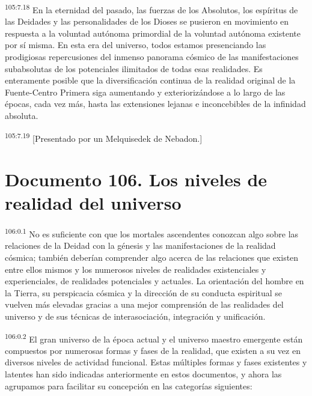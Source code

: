 \documentclass[twoside, 11pt]{book}
\begin{document}
\par
\textsuperscript{105:7.18} En la eternidad del pasado, las fuerzas de los Absolutos, los espíritus de las Deidades y las personalidades de los Dioses se pusieron en movimiento en respuesta a la voluntad autónoma primordial de la voluntad autónoma existente por sí misma. En esta era del universo, todos estamos presenciando las prodigiosas repercusiones del inmenso panorama cósmico de las manifestaciones subabsolutas de los potenciales ilimitados de todas esas realidades. Es enteramente posible que la diversificación continua de la realidad original de la Fuente-Centro Primera siga aumentando y exteriorizándose a lo largo de las épocas, cada vez más, hasta las extensiones lejanas e inconcebibles de la infinidad absoluta.

\par
\textsuperscript{105:7.19} [Presentado por un Melquisedek de Nebadon.]


\chapter{Documento 106. Los niveles de realidad del universo}
\par
\textsuperscript{106:0.1} No es suficiente con que los mortales ascendentes conozcan algo sobre las relaciones de la Deidad con la génesis y las manifestaciones de la realidad cósmica; también deberían comprender algo acerca de las relaciones que existen entre ellos mismos y los numerosos niveles de realidades existenciales y experienciales, de realidades potenciales y actuales. La orientación del hombre en la Tierra, su perspicacia cósmica y la dirección de su conducta espiritual se vuelven más elevadas gracias a una mejor comprensión de las realidades del universo y de sus técnicas de interasociación, integración y unificación.

\par
\textsuperscript{106:0.2} El gran universo de la época actual y el universo maestro emergente están compuestos por numerosas formas y fases de la realidad, que existen a su vez en diversos niveles de actividad funcional. Estas múltiples formas y fases existentes y latentes han sido indicadas anteriormente en estos documentos, y ahora las agrupamos para facilitar su concepción en las categorías siguientes:
\end{document}
